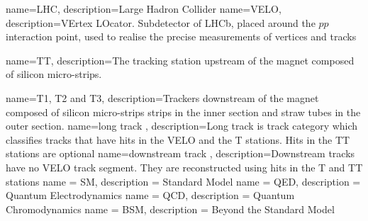                  {
                   name=LHC,
                   description={Large Hadron Collider}
                 }
                 {
                   name=VELO,
                   description={VErtex LOcator. Subdetector of LHCb, placed around the $pp$ interaction point, used to realise the precise measurements of vertices and tracks}
                 }

	{
                   name=TT,
                   description={The tracking station upstream of the magnet composed of silicon micro-strips.}
        }


                 {
                   name=T1{,} T2 and T3,
                   description={Trackers downstream of the magnet composed of silicon micro-strips strips in the inner section and straw tubes in the outer section.}
                 }
              {
                   name=long track ,
                   description={Long track is track category which classifies tracks that have hits in the VELO and the T stations. Hits in the TT stations are optional}
              }
              {
                   name=downstream track ,
                   description={Downstream tracks have no VELO track segment. They are reconstructed using hits in the T and TT stations}
              }
                 {      
                 name = SM,
                 description = {Standard Model}     
                 }
                 {      
                 name = QED,
                 description = {Quantum Electrodynamics}     
                 }
                 {      
                 name = QCD,
                 description = {Quantum Chromodynamics}     
                 }
                 {      
                 name = BSM,
                 description = {Beyond the Standard Model}     
                 }
                  
